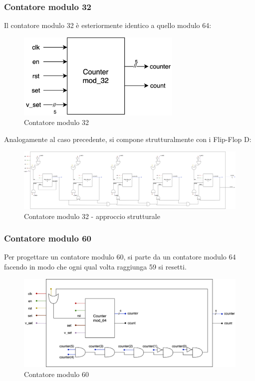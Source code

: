 \subsubsection{Contatore modulo 32}
Il contatore modulo 32 è esteriormente identico a quello modulo 64:
\begin{figure}[H]
	\centering
	\includegraphics[width=0.7\textwidth]{img/counter_mod_32.png}
	\caption{Contatore modulo 32}
	\label{cnt_32} 
\end{figure}

\noindent Analogamente al caso precedente, si compone strutturalmente con i Flip-Flop D:
\clearpage
\begin{figure}
	\centering
	\includegraphics[width=1\textwidth]{img/counter_mod_32_str.png}
	\caption{Contatore modulo 32 - approccio strutturale}
	\label{cnt_32_str} 
\end{figure}
\clearpage

\subsubsection{Contatore modulo 60}
Per progettare un contatore modulo 60, si parte da un contatore modulo 64 facendo in modo che ogni qual volta raggiunga 59 si resetti.
\begin{figure}[H]
	\centering
	\includegraphics[width=1\textwidth]{img/counter_mod_60.png}
	\caption{Contatore modulo 60}
	\label{cnt_60} 
\end{figure}

